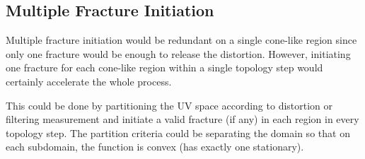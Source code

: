

\subsection{Multiple Fracture Initiation}
\minchen{[TODO]}

Multiple fracture initiation would be redundant on a single cone-like region since only one fracture would be enough to release the distortion. However, initiating one fracture for each cone-like region within a single topology step would certainly accelerate the whole process.

This could be done by partitioning the UV space according to distortion or filtering measurement and initiate a valid fracture (if any) in each region in every topology step. The partition criteria could be separating the domain so that on each subdomain, the function is convex (has exactly one stationary).